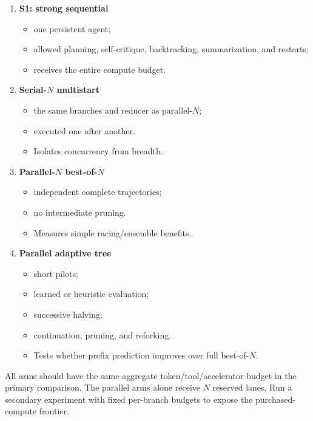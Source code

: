 \documentclass[
  letterpaper,
]{article}
\providecommand{\tightlist}{%
  \setlength{\itemsep}{0pt}\setlength{\parskip}{0pt}}
\begin{document}
\begin{enumerate}
\def\labelenumi{\arabic{enumi}.}
\tightlist
\item
  \textbf{S1: strong sequential}

  \begin{itemize}
  \tightlist
  \item
    one persistent agent;
  \item
    allowed planning, self-critique, backtracking, summarization, and restarts;
  \item
    receives the entire compute budget.
  \end{itemize}
\item
  \textbf{Serial-\(N\) multistart}

  \begin{itemize}
  \tightlist
  \item
    the same branches and reducer as parallel-\(N\);
  \item
    executed one after another.
  \item
    Isolates concurrency from breadth.
  \end{itemize}
\item
  \textbf{Parallel-\(N\) best-of-\(N\)}

  \begin{itemize}
  \tightlist
  \item
    independent complete trajectories;
  \item
    no intermediate pruning.
  \item
    Measures simple racing/ensemble benefits.
  \end{itemize}
\item
  \textbf{Parallel adaptive tree}

  \begin{itemize}
  \tightlist
  \item
    short pilots;
  \item
    learned or heuristic evaluation;
  \item
    successive halving;
  \item
    continuation, pruning, and reforking.
  \item
    Tests whether prefix prediction improves over full best-of-\(N\).
  \end{itemize}
\end{enumerate}

All arms should have the same aggregate token/tool/accelerator budget in the primary comparison. The parallel arms alone receive \(N\) reserved lanes. Run a secondary experiment with fixed per-branch budgets to expose the purchased-compute frontier.
\end{document}
